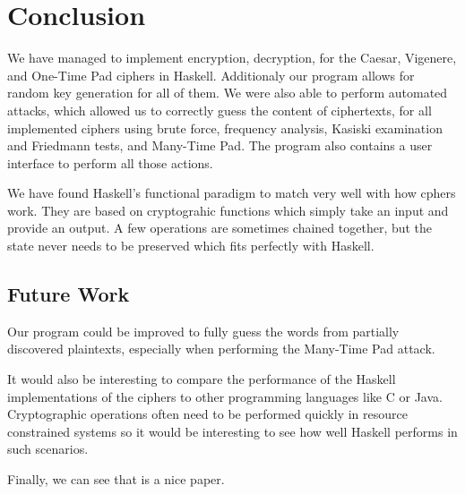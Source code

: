 
\section{Conclusion}\label{sec:Conclusion}

We have managed to implement encryption, decryption, for the Caesar, Vigenere, and One-Time Pad ciphers in Haskell. Additionaly our program allows for random key generation for all of them. We were also able to perform automated attacks, which allowed us to correctly guess the content of ciphertexts, for all implemented ciphers using brute force, frequency analysis, Kasiski examination and Friedmann tests, and Many-Time Pad. The program also contains a user interface to perform all those actions.

We have found Haskell's functional paradigm to match very well with how cphers work. They are based on cryptograhic functions which simply take an input and provide an output. A few operations are sometimes chained together, but the state never needs to be preserved which fits perfectly with Haskell.

\subsection{Future Work}
Our program could be improved to fully guess the words from partially discovered plaintexts, especially when performing the Many-Time Pad attack.

It would also be interesting to compare the performance of the Haskell implementations of the ciphers to other programming languages like C or Java. Cryptographic operations often need to be performed quickly in resource constrained systems so it would be interesting to see how well Haskell performs in such scenarios.

Finally, we can see that \cite{liuWang2013:agentTypesHLPE} is a nice paper.
